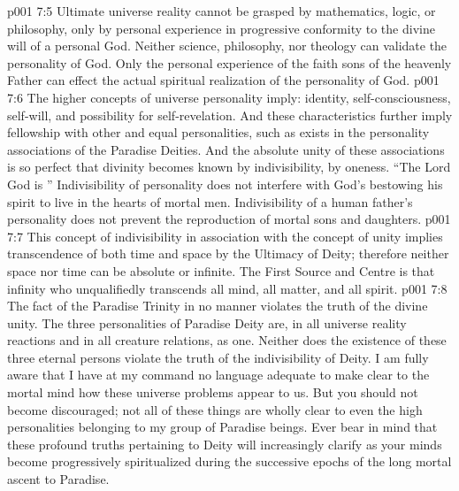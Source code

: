 \vs p001 7:5 Ultimate universe reality cannot be grasped by mathematics, logic, or philosophy, only by personal experience in progressive conformity to the divine will of a personal God. Neither science, philosophy, nor theology can validate the personality of God. Only the personal experience of the faith sons of the heavenly Father can effect the actual spiritual realization of the personality of God.
\vs p001 7:6 \pc The higher concepts of universe personality imply: identity, self\hyp{}consciousness, self\hyp{}will, and possibility for self\hyp{}revelation. And these characteristics further imply fellowship with other and equal personalities, such as exists in the personality associations of the Paradise Deities. And the absolute unity of these associations is so perfect that divinity becomes known by indivisibility, by oneness. “The Lord God is ” Indivisibility of personality does not interfere with God’s bestowing his spirit to live in the hearts of mortal men. Indivisibility of a human father’s personality does not prevent the reproduction of mortal sons and daughters.
\vs p001 7:7 This concept of indivisibility in association with the concept of unity implies transcendence of both time and space by the Ultimacy of Deity; therefore neither space nor time can be absolute or infinite. The First Source and Centre is that infinity who unqualifiedly transcends all mind, all matter, and all spirit.
\vs p001 7:8 The fact of the Paradise Trinity in no manner violates the truth of the divine unity. The three personalities of Paradise Deity are, in all universe reality reactions and in all creature relations, as one. Neither does the existence of these three eternal persons violate the truth of the indivisibility of Deity. I am fully aware that I have at my command no language adequate to make clear to the mortal mind how these universe problems appear to us. But you should not become discouraged; not all of these things are wholly clear to even the high personalities belonging to my group of Paradise beings. Ever bear in mind that these profound truths pertaining to Deity will increasingly clarify as your minds become progressively spiritualized during the successive epochs of the long mortal ascent to Paradise.
\vsetoff
